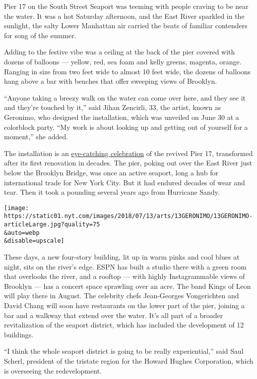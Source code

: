 Pier 17 on the South Street Seaport was teeming with people craving to
be near the water. It was a hot Saturday afternoon, and the East River
sparkled in the sunlight, the salty Lower Manhattan air carried the
beats of familiar contenders for song of the summer.

Adding to the festive vibe was a ceiling at the back of the pier covered
with dozens of balloons --- yellow, red, sea foam and kelly greens,
magenta, orange. Ranging in size from two feet wide to almost 10 feet
wide, the dozens of balloons hang above a bar with benches that offer
sweeping views of Brooklyn.

``Anyone taking a breezy walk on the water can come over here, and they
see it and they're touched by it,'' said Jihan Zencirli, 33, the artist,
known as Geronimo, who designed the installation, which was unveiled on
June 30 at a colorblock party. ``My work is about looking up and getting
out of yourself for a moment,'' she added.

The installation is an
\href{https://www.pier17ny.com/content/hhc/pier17ny/en/whats-on-folder/whats-on/geronimo.html}{eye-catching
celebration} of the revived Pier 17, transformed after its first
renovation in decades. The pier, poking out over the East River just
below the Brooklyn Bridge, was once an active seaport, long a hub for
international trade for New York City. But it had endured decades of
wear and tear. Then it took a pounding several years ago from Hurricane
Sandy.

\texttt{[image: https://static01.nyt.com/images/2018/07/13/arts/13GERONIMO/13GERONIMO-articleLarge.jpg?quality=75\\\&auto=webp\\\&disable=upscale]}

These days, a new four-story building, lit up in warm pinks and cool
blues at night, sits on the river's edge. ESPN has built a studio there
with a green room that overlooks the river, and a rooftop --- with
highly Instagrammable views of Brooklyn --- has a concert space
sprawling over an acre. The band Kings of Leon will play there in
August. The celebrity chefs Jean-Georges Vongerichten and David Chang
will soon have restaurants on the lower part of the pier, joining a bar
and a walkway that extend over the water. It's all part of a broader
revitalization of the seaport district, which has included the
development of 12 buildings.

``I think the whole seaport district is going to be really
experiential,'' said Saul Scherl, president of the tristate region for
the Howard Hughes Corporation, which is overseeing the redevelopment.

